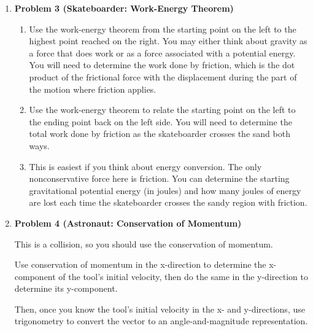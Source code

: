 \documentclass[12pt]{article}
\begin{document}
\begin{enumerate}
\item \bf Problem 3 (Skateboarder:  Work-Energy Theorem) \rm
\begin{enumerate}
	\item Use the work-energy theorem from the starting point on the left to the highest point reached on the right. You may either think about gravity as a force that does work or as a force associated with a potential energy. You will need to determine the work done by friction, which is the dot product of the frictional force with the displacement during the part of the motion where friction applies.
	\item Use the work-energy theorem to relate the starting point on the left to the ending point back on the left side. You will need to determine the total work done by friction as the skateboarder crosses the sand both ways.
	\item This is easiest if you think about energy conversion. The only nonconservative force here is friction. You can determine the starting gravitational potential energy (in joules) and how many joules of energy are lost each time the skateboarder crosses the sandy region with friction.
\end{enumerate} 
\vspace{1in}
\item \bf  Problem 4 (Astronaut: Conservation of Momentum)\rm

This is a collision, so you should use the conservation of momentum.

Use conservation of momentum in the x-direction to determine the x-component of the tool's initial velocity, then do the same in the y-direction to determine its y-component.

Then, once you know the tool's initial velocity in the x- and y-directions, use trigonometry to convert the vector to an angle-and-magnitude representation.


\end{enumerate}
%
%
\end{document}
